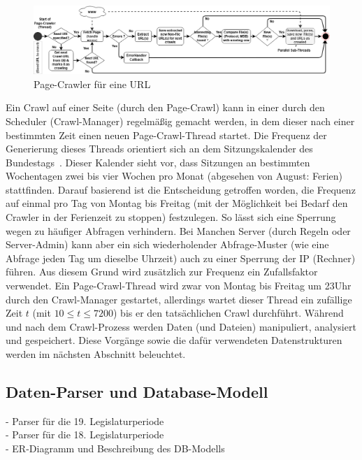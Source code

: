 \begin{figure}[H]
    \centering
    \includegraphics[width=5.5in]{images/02-Crawler/Crawler-Process-Diagram (Page-Crawler).png}
    \caption{Page-Crawler für eine URL}
    \label{fig:crawlEinerUrl}
\end{figure}
\noindent
Ein Crawl auf einer Seite (durch den Page-Crawl) kann in einer durch den Scheduler (Crawl-Manager) regelmäßig gemacht werden, in dem dieser nach einer bestimmten Zeit einen neuen Page-Crawl-Thread startet. Die Frequenz der Generierung dieses Threads orientiert sich an dem Sitzungskalender des Bundestags~\cite{Sitzungskalender2021}. Dieser Kalender sieht vor, dass Sitzungen an bestimmten Wochentagen zwei bis vier Wochen pro Monat (abgesehen von August: Ferien) stattfinden. Darauf basierend ist die Entscheidung getroffen worden, die Frequenz auf einmal pro Tag von Montag bis Freitag (mit der Möglichkeit bei Bedarf den Crawler in der Ferienzeit zu stoppen) festzulegen. So lässt sich eine Sperrung wegen zu häufiger Abfragen verhindern. Bei Manchen Server (durch Regeln oder Server-Admin) kann aber ein sich wiederholender Abfrage-Muster (wie eine Abfrage jeden Tag um dieselbe Uhrzeit) auch zu einer Sperrung der IP (Rechner) führen. Aus diesem Grund wird zusätzlich zur Frequenz ein Zufallsfaktor verwendet. Ein Page-Crawl-Thread wird zwar von Montag bis Freitag um 23Uhr durch den Crawl-Manager gestartet, allerdings wartet dieser Thread ein zufällige Zeit $t$ (mit $10 \leq t \leq 7200 $) bis er den tatsächlichen Crawl durchführt. Während und nach dem Crawl-Prozess werden Daten (und Dateien) manipuliert, analysiert und gespeichert. Diese Vorgänge sowie die dafür verwendeten Datenstrukturen werden im nächsten Abschnitt beleuchtet. 

\subsection{Daten-Parser und Database-Modell}
- Parser für die 19. Legislaturperiode\\
- Parser für die 18. Legislaturperiode\\
- ER-Diagramm und Beschreibung des DB-Modells


